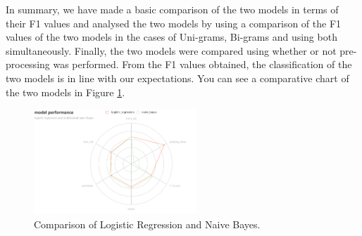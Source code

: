 \documentclass[a4paper, 11pt]{article}
\begin{document}
\begin{multicols}{2}
In summary, we have made a basic comparison of the two models in terms of their F1 values and analysed the two models by using a comparison of the F1 values of the two models in the cases of Uni-grams, Bi-grams and using both simultaneously. Finally, the two models were compared using whether or not pre-processing was performed. From the F1 values obtained, the classification of the two models is in line with our expectations. You can see a comparative chart of the two models in Figure \ref{fancy}.

\end{multicols}
\begin{figure}[h]
    \centering
    \includegraphics[width=0.545\textwidth]{figures/model_performance.png}
    \caption{Comparison of Logistic Regression and Naive Bayes.}\label{fancy}
\end{figure}
\end{document}
